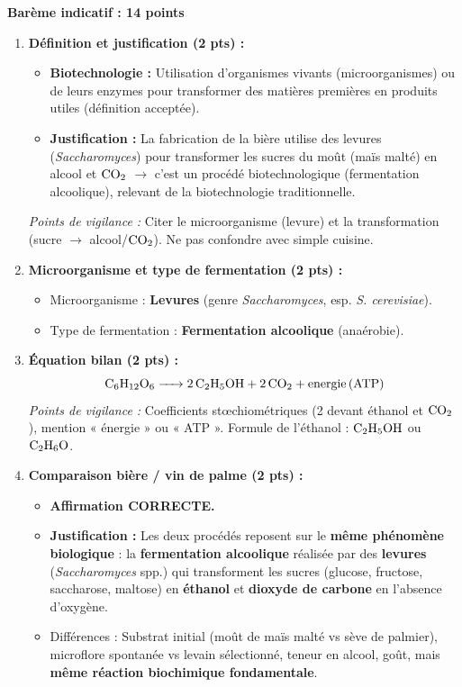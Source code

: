 \documentclass[11pt]{article}
\begin{document}
\begin{corrige}
\textbf{Barème indicatif : 14 points}

\begin{enumerate}
\item \textbf{Définition et justification (2 pts) :}
\begin{itemize}
\item \textbf{Biotechnologie :} Utilisation d'organismes vivants (microorganismes) ou de leurs enzymes pour transformer des matières premières en produits utiles (définition acceptée).
\item \textbf{Justification :} La fabrication de la bière utilise des levures (\emph{Saccharomyces}) pour transformer les sucres du moût (maïs malté) en alcool et $\ce{CO2}$ $\rightarrow$ c'est un procédé biotechnologique (fermentation alcoolique), relevant de la biotechnologie traditionnelle.
\end{itemize}
\textit{Points de vigilance :} Citer le microorganisme (levure) et la transformation (sucre $\rightarrow$ alcool/$\ce{CO2}$). Ne pas confondre avec simple cuisine.

\item \textbf{Microorganisme et type de fermentation (2 pts) :}
\begin{itemize}
\item Microorganisme : \textbf{Levures} (genre \emph{Saccharomyces}, esp. \emph{S. cerevisiae}).
\item Type de fermentation : \textbf{Fermentation alcoolique} (anaérobie).
\end{itemize}

\item \textbf{Équation bilan (2 pts) :}
\[ \ce{C6H12O6 -> 2 C2H5OH + 2 CO2 + energie (ATP)} \]
\textit{Points de vigilance :} Coefficients stœchiométriques (2 devant éthanol et $\ce{CO2}$), mention « énergie » ou « ATP ». Formule de l'éthanol : $\ce{C2H5OH}$ ou $\ce{C2H6O}$.

\item \textbf{Comparaison bière / vin de palme (2 pts) :}
\begin{itemize}
\item \textbf{Affirmation CORRECTE.}
\item \textbf{Justification :} Les deux procédés reposent sur le \textbf{même phénomène biologique} : la \textbf{fermentation alcoolique} réalisée par des \textbf{levures} (\emph{Saccharomyces} spp.) qui transforment les sucres (glucose, fructose, saccharose, maltose) en \textbf{éthanol} et \textbf{dioxyde de carbone} en l'absence d'oxygène.
\item Différences : Substrat initial (moût de maïs malté vs sève de palmier), microflore spontanée vs levain sélectionné, teneur en alcool, goût, mais \textbf{même réaction biochimique fondamentale}.
\end{itemize}


\end{enumerate}
\end{corrige}
\end{document}
